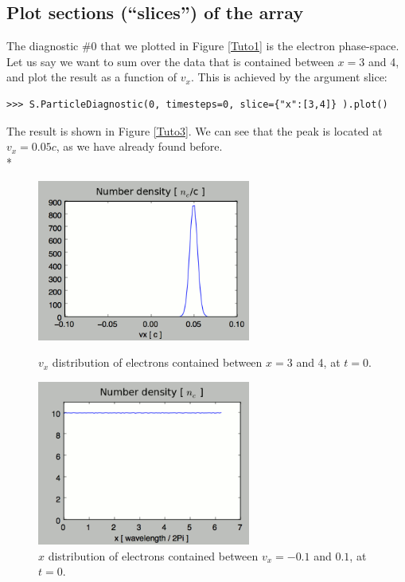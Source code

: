 \documentclass[11pt]{article}
\newcommand{\code}[1]{\colorbox{yellow!15}{\ttfamily #1}}
\begin{document}
\subsection{Plot sections (``slices'') of the array}

The diagnostic \#0 that we plotted in Figure \ref{Tuto1} is the electron phase-space.
Let us say we want to sum over the data that is contained between $x=3$ and 4, and plot the result as a function of $v_x$.
This is achieved by the argument \code{slice}:
\begin{lstlisting}
>>> S.ParticleDiagnostic(0, timesteps=0, slice={"x":[3,4]} ).plot()
\end{lstlisting}
The result is shown in Figure \ref{Tuto3}. We can see that the peak is located at $v_x=0.05c$, as we have already found before.\\*

\begin{figure}[htbp]
\centering
\begin{minipage}[b]{.46\linewidth}
\includegraphics[width=7cm]{ParticleDiagTutorial3}
\caption{$v_x$ distribution of electrons contained between $x=3$ and 4, at $t=0$.}
\label{Tuto3}
\end{minipage}
\hfill{}
\begin{minipage}[b]{.46\linewidth}
\includegraphics[width=7cm]{ParticleDiagTutorial4}
\caption{$x$ distribution of electrons contained between $v_x=-0.1$ and $0.1$, at $t=0$.}
\label{Tuto4}
\end{minipage}
\end{figure}
\end{document}
